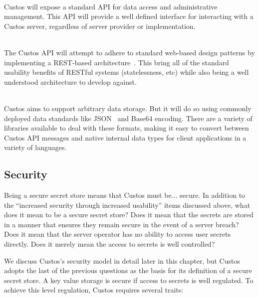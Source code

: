 \begin{packed_desc}
\item[Well Defined API] \hfill \\ Custos will expose a standard API
  for data access and administrative management. This API will provide
  a well defined interface for interacting with a Custos server,
  regardless of server provider or implementation.
\item[Standard Design Patterns] \hfill \\ The Custos API will attempt
  to adhere to standard web-based design patterns by implementing a
  REST-based architecture~\cite{ibm-restful}. This bring all of the
  standard usability benefits of RESTful systems (statelessness, etc)
  while also being a well understood architecture to develop against.
\item[Standard Data Formats] \hfill \\ Custos aims to support
  arbitrary data storage. But it will do so using commonly deployed
  data standards like JSON~\cite{json} and Base64 encoding. There are
  a variety of libraries available to deal with these formats, making
  it easy to convert between Custos API messages and native internal
  data types for client applications in a variety of languages.
\end{packed_desc}

\subsection{Security}

Being a secure secret store means that Custos must be... secure.  In
addition to the ``increased security through increased usability''
items discussed above, what does it mean to be a secure secret store?
Does it mean that the secrets are stored in a manner that ensures they
remain secure in the event of a server breach? Does it mean that the
server operator has no ability to access user secrets directly. Does
it merely mean the access to secrets is well controlled?

We discuss Custos's security model in detail later in this chapter,
but Custos adopts the last of the previous questions as the basis for
its definition of a secure secret store. A key value storage is
secure if access to secrets is well regulated. To achieve this
level regulation, Custos requires several traits:

